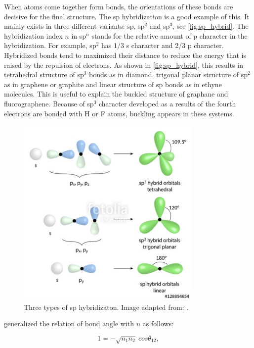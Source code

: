 When atoms come together form bonds, the orientations of these bonds are decisive for the final structure. The sp hybridization is a good example of this.  It mainly exists in three different variants: sp, sp$^2$ and sp$^3$, see \autoref{fig:sp_hybrid}. The hybridization index $n$ in sp$^n$ stands for the relative amount of p character in the hybridization. For example, sp$^2$ has 1/3 s character and 2/3 p character. Hybridized bonds tend to maximized their distance to reduce the energy that is raised by the repulsion of electrons. As shown in \autoref{fig:sp_hybrid}, this results in tetrahedral structure of sp$^3$ bonds as in diamond, trigonal planar structure of sp$^2$ as in graphene or graphite and linear structure of sp bonds as in ethyne molecules.  This is useful to explain the buckled structure of graphane and fluorographene. Because of sp$^3$ character developed as a results of the fourth electrons are bonded with H or F atoms, buckling appears in these systems. 

\begin{figure}[htbp!] 
\centering  
\includegraphics[width=0.8\textwidth]{sp_hybrid.png}
\caption{Three types of sp hybridizaton. Image adapted from: \cite{sp_hybrid}. }  
\label{fig:sp_hybrid}
\end{figure} 

\citet{coulson1949} generalized the relation of bond angle with $n$ as follows:

\begin{equation}\label{coulson}
1=-\sqrt{n_1n_2}~cos\theta_{12}, 
\end{equation}

